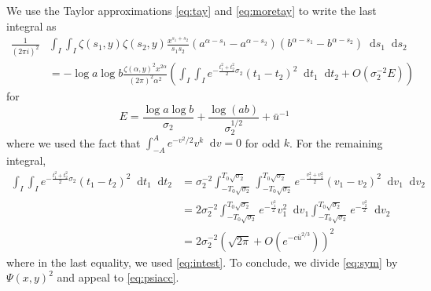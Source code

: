 \documentclass{amsart}
\theoremstyle{plain}
\theoremstyle{remark}
\newcommand*\diff{\mathop{}\!\mathrm{d}}
\newcommand{\ubar}{\bar{u}}
\begin{document}
	We use the Taylor approximations \eqref{eq:tay} and \eqref{eq:moretay} to write the last integral as
	\begin{align*}
		\frac{1}{(2\pi i)^2} &\int_I \int_I \zeta(s_1,y)\zeta(s_2,y) \frac{x^{s_1+s_2}}{s_1 s_2} (a^{\alpha-s_1}-a^{\alpha-s_2})(b^{\alpha-s_1}-b^{\alpha-s_2})\diff{s_1}\diff{s_2} \\
		&=-\log a \log b\frac{\zeta(\alpha,y)^2 x^{2\alpha}}{(2\pi)^2\alpha^2} \left( \int_I \int_I e^{-\frac{t_1^2+t_2^2}{2} \sigma_2} (t_1-t_2)^2  \diff{t_1}\diff{t_2} + O(\sigma_2^{-2} E)\right)
	\end{align*}
	for
	\[ E =  \frac{\log a\log b}{\sigma_2} + \frac{\log (ab)}{\sigma_2^{1/2}} + \ubar^{-1}\]
	where we used the fact that $\int_{-A}^{A} e^{-v^2/2}v^k \diff{v}=0$ for odd $k$. For the remaining integral,
	\begin{align*}
		\int_I\int_I e^{-\frac{t_1^2+t_2^2}{2} \sigma_2} (t_1-t_2)^2 \diff{t_1}\diff{t_2}&=\sigma_2^{-2}  \int_{-T_0\sqrt{\sigma_2}}^{T_0\sqrt{\sigma_2}}
		\int_{-T_0\sqrt{\sigma_2}}^{T_0\sqrt{\sigma_2}}e^{-\frac{v_1^2+v_2^2}{2}} (v_1-v_2)^2  \diff{v_1}\diff{v_2}\\
		&=2\sigma_2^{-2} \int_{-T_0\sqrt{\sigma_2}}^{T_0\sqrt{\sigma_2}}e^{-\frac{v_1^2}{2}}v_1^2  \diff{v_1} \int_{-T_0\sqrt{\sigma_2}}^{T_0\sqrt{\sigma_2}}e^{-\frac{v_2^2}{2}}  \diff{v_2}\\
		&=2\sigma_2^{-2}  (   \sqrt{2\pi} + O(e^{-c\ubar^{2/3} }))^2
	\end{align*}
	where in the last equality, we used \eqref{eq:intest}. To conclude, we divide \eqref{eq:sym} by $\Psi(x,y)^2$ and appeal to \eqref{eq:psiacc}.



\end{document}
